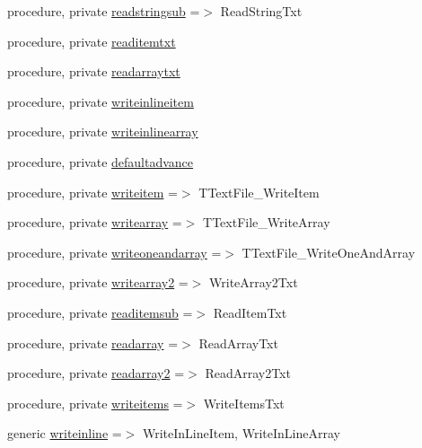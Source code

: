 \begin{DoxyCompactItemize}
\item 
procedure, private \mbox{\hyperlink{structfileutils_1_1ttextfile_af52ca4b092da2e52a4947e33713d4f1d}{readstringsub}} =$>$ Read\+String\+Txt
\item 
procedure, private \mbox{\hyperlink{structfileutils_1_1ttextfile_a644b521b5b04da63e71e52ddbe3f6ecb}{readitemtxt}}
\item 
procedure, private \mbox{\hyperlink{structfileutils_1_1ttextfile_abf390cc2022aaf517397cbe6e6e243a7}{readarraytxt}}
\item 
procedure, private \mbox{\hyperlink{structfileutils_1_1ttextfile_a979edee0c3308fa865453062c9d5e803}{writeinlineitem}}
\item 
procedure, private \mbox{\hyperlink{structfileutils_1_1ttextfile_a9dbe0251fe60b96438cbbe127f806df9}{writeinlinearray}}
\item 
procedure, private \mbox{\hyperlink{structfileutils_1_1ttextfile_af2a76455d8772ab315068adb3fc98393}{defaultadvance}}
\item 
procedure, private \mbox{\hyperlink{structfileutils_1_1ttextfile_a199cbe1086f30ab1781dab422aa0ee00}{writeitem}} =$>$ T\+Text\+File\+\_\+\+Write\+Item
\item 
procedure, private \mbox{\hyperlink{structfileutils_1_1ttextfile_a4ad44435682c5d515b26a0b031a0f35f}{writearray}} =$>$ T\+Text\+File\+\_\+\+Write\+Array
\item 
procedure, private \mbox{\hyperlink{structfileutils_1_1ttextfile_a61570c88521179de2d91cafc363f8344}{writeoneandarray}} =$>$ T\+Text\+File\+\_\+\+Write\+One\+And\+Array
\item 
procedure, private \mbox{\hyperlink{structfileutils_1_1ttextfile_a53d8e9cdd4ae35ce8298d1a42efe4fa6}{writearray2}} =$>$ Write\+Array2\+Txt
\item 
procedure, private \mbox{\hyperlink{structfileutils_1_1ttextfile_af3e93d23ba5da50b16a0e9166d20ec91}{readitemsub}} =$>$ Read\+Item\+Txt
\item 
procedure, private \mbox{\hyperlink{structfileutils_1_1ttextfile_a20f2378163be0f3877a8b2eb97602f54}{readarray}} =$>$ Read\+Array\+Txt
\item 
procedure, private \mbox{\hyperlink{structfileutils_1_1ttextfile_a3b2cb7e3b0f29f3cc294627c2fd933a9}{readarray2}} =$>$ Read\+Array2\+Txt
\item 
procedure, private \mbox{\hyperlink{structfileutils_1_1ttextfile_a1d830488b51cccb1c6f065fda6177b8b}{writeitems}} =$>$ Write\+Items\+Txt
\item 
generic \mbox{\hyperlink{structfileutils_1_1ttextfile_aa378c8c381549a04f131624d4c37fbe5}{writeinline}} =$>$ Write\+In\+Line\+Item, Write\+In\+Line\+Array
\end{DoxyCompactItemize}
